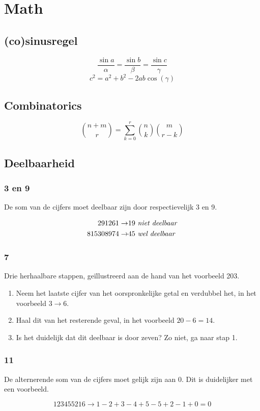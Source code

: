 \documentclass[10pt,hidelinks]{article}
\begin{document}
\section{Math}
\subsection{(co)sinusregel}

\[\frac{\sin a}{\alpha} = \frac{\sin b}{\beta} =\frac{\sin c}{\gamma}\]
\[c^2=a^2+b^2-2ab\cos(\gamma)\]

\subsection{Combinatorics}

\[\binom{n+m}{r} = \sum_{k=0}^r \binom{n}{k} \binom{m}{r-k}\]

\subsection{Deelbaarheid}

\subsubsection{3 en 9}

De som van de cijfers moet deelbaar zijn door respectievelijk 3 en 9.

\begin{align*}
	291261 \to & 19 \text{ \emph{niet deelbaar}} \\
	815308974 \to & 45 \text{ \emph{wel deelbaar}}
\end{align*}

\subsubsection{7}

Drie herhaalbare stappen, ge\"illustreerd aan de hand van het voorbeeld 203.

\begin{enumerate}
	\item Neem het laatste cijfer van het oorspronkelijke getal en verdubbel het, in het voorbeeld $3 \to 6$.
	\item Haal dit van het resterende geval, in het voorbeeld $20 - 6 = 14$.
	\item Is het duidelijk dat dit deelbaar is door zeven? Zo niet, ga naar stap 1.
\end{enumerate}

\subsubsection{11}

De alternerende som van de cijfers moet gelijk zijn aan 0. Dit is duidelijker met een voorbeeld.

\[123455216 \to 1 - 2 + 3 - 4 + 5 - 5 + 2 - 1 + 0 = 0\]
\end{document}
